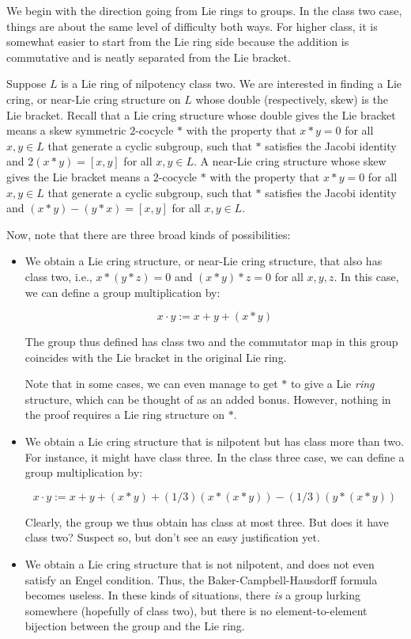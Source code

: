 \documentclass[10pt]{amsart}
\begin{document}
We begin with the direction going from Lie rings to groups. In the
class two case, things are about the same level of difficulty both
ways. For higher class, it is somewhat easier to start from the Lie
ring side because the addition is commutative and is neatly separated
from the Lie bracket. 

Suppose $L$ is a Lie ring of nilpotency class two. We are interested
in finding a Lie cring, or near-Lie cring structure on $L$ whose
double (respectively, skew) is the Lie bracket. Recall that a Lie
cring structure whose double gives the Lie bracket means a skew
symmetric $2$-cocycle $*$ with the property that $x * y = 0$ for all
$x,y \in L$ that generate a cyclic subgroup, such that $*$ satisfies
the Jacobi identity and $2(x * y) = [x,y]$ for all $x,y \in L$. A
near-Lie cring structure whose skew gives the Lie bracket means a
$2$-cocycle $*$ with the property that $x * y = 0$ for all $x,y \in L$
that generate a cyclic subgroup, such that $*$ satisfies the Jacobi
identity and $(x * y) - (y * x) = [x,y]$ for all $x,y \in L$.

Now, note that there are three broad kinds of possibilities:

\begin{itemize}
\item We obtain a Lie cring structure, or near-Lie cring
  structure, that also has class two, i.e., $x * (y * z) = 0$ and $(x
  * y) * z = 0$ for all $x,y,z$. In this case, we can define a group
  multiplication by:

  $$x \cdot y := x + y + (x * y)$$

  The group thus defined has class two and the commutator map in this
  group coincides with the Lie bracket in the original Lie ring.

  Note that in some cases, we can even manage to get $*$ to give a Lie
  {\em ring} structure, which can be thought of as an added
  bonus. However, nothing in the proof requires a Lie ring structure
  on $*$.
\item We obtain a Lie cring structure that is nilpotent but has
  class more than two. For instance, it might have class three. In the
  class three case, we can define a group multiplication by:

  $$x \cdot y := x + y + (x * y) + (1/3)(x * (x * y)) - (1/3)(y * (x * y))$$

  Clearly, the group we thus obtain has class at most three. But does
  it have class two? Suspect so, but don't see an easy justification yet.
\item We obtain a Lie cring structure that is not nilpotent, and
  does not even satisfy an Engel condition. Thus, the
  Baker-Campbell-Hausdorff formula becomes useless. In these kinds of
  situations, there {\em is} a group lurking somewhere (hopefully of
  class two), but there is no element-to-element bijection between the
  group and the Lie ring.
\end{itemize}
\end{document}
